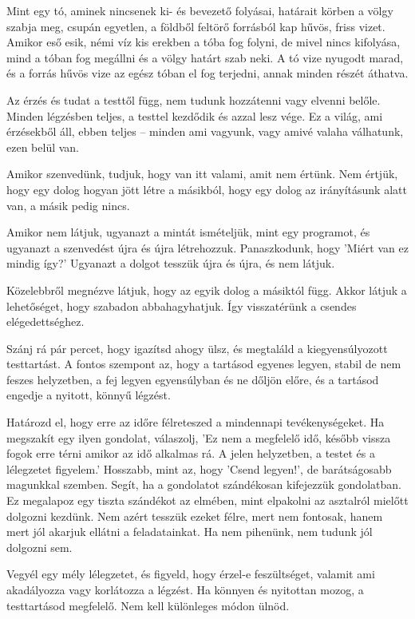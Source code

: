 Mint egy tó, aminek nincsenek ki- és bevezető folyásai, határait körben
a völgy szabja meg, csupán egyetlen, a földből feltörő forrásból kap
hűvös, friss vizet. Amikor eső esik, némi víz kis erekben a tóba fog
folyni, de mivel nincs kifolyása, mind a tóban fog megállni és a völgy
határt szab neki. A tó vize nyugodt marad, és a forrás hűvös vize az
egész tóban el fog terjedni, annak minden részét áthatva.

Az érzés és tudat a testtől függ, nem tudunk hozzátenni vagy elvenni
belőle. Minden légzésben teljes, a testtel kezdődik és azzal lesz vége.
Ez a világ, ami érzésekből áll, ebben teljes -- minden ami vagyunk, vagy
amivé valaha válhatunk, ezen belül van.

Amikor szenvedünk, tudjuk, hogy van itt valami, amit nem értünk. Nem
értjük, hogy egy dolog hogyan jött létre a másikból, hogy egy dolog az
irányításunk alatt van, a másik pedig nincs.

Amikor nem látjuk, ugyanazt a mintát ismételjük, mint egy programot, és
ugyanazt a szenvedést újra és újra létrehozzuk. Panaszkodunk, hogy
'Miért van ez mindig így?' Ugyanazt a dolgot tesszük újra és újra, és
nem látjuk.

Közelebbről megnézve látjuk, hogy az egyik dolog a másiktól függ. Akkor
látjuk a lehetőséget, hogy szabadon abbahagyhatjuk. Így visszatérünk a
csendes elégedettséghez.

Szánj rá pár percet, hogy igazítsd ahogy ülsz, és megtaláld a
kiegyensúlyozott testtartást. A fontos szempont az, hogy a tartásod
egyenes legyen, stabil de nem feszes helyzetben, a fej legyen
egyensúlyban és ne dőljön előre, és a tartásod engedje a nyitott, könnyű
légzést.

Határozd el, hogy erre az időre félreteszed a mindennapi
tevékenységeket. Ha megszakít egy ilyen gondolat, válaszolj, 'Ez nem a
megfelelő idő, később vissza fogok erre térni amikor az idő alkalmas rá.
A jelen helyzetben, a testet és a lélegzetet figyelem.' Hosszabb, mint
az, hogy 'Csend legyen!', de barátságosabb magunkkal szemben. Segít, ha
a gondolatot szándékosan kifejezzük gondolatban. Ez megalapoz egy tiszta
szándékot az elmében, mint elpakolni az asztalról mielőtt dolgozni
kezdünk. Nem azért tesszük ezeket félre, mert nem fontosak, hanem mert
jól akarjuk ellátni a feladatainkat. Ha nem pihenünk, nem tudunk jól
dolgozni sem.

Vegyél egy mély lélegzetet, és figyeld, hogy érzel-e feszültséget,
valamit ami akadályozza vagy korlátozza a légzést. Ha könnyen és
nyitottan mozog, a testtartásod megfelelő. Nem kell különleges módon
ülnöd.

